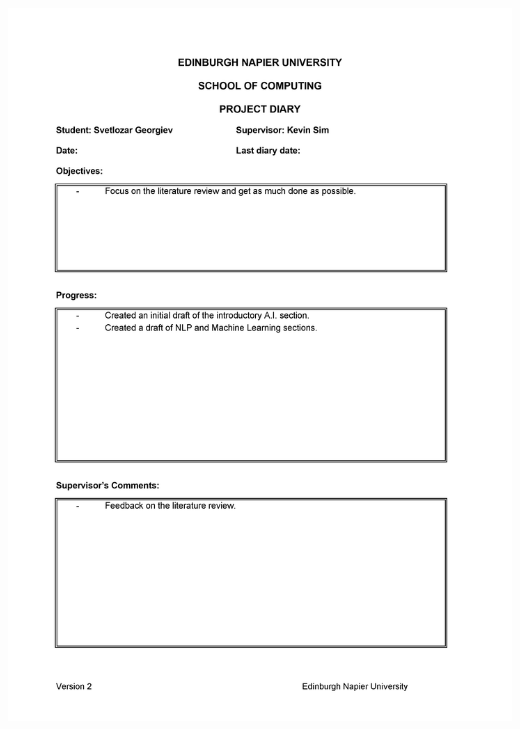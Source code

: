 \documentclass[12pt,a4paper]{article}
\begin{document}
\begin{appendices}
\includegraphics[width=\textwidth,height=\textheight,keepaspectratio]{diary6.png} 

\newpage

\end{appendices}
\end{document}
